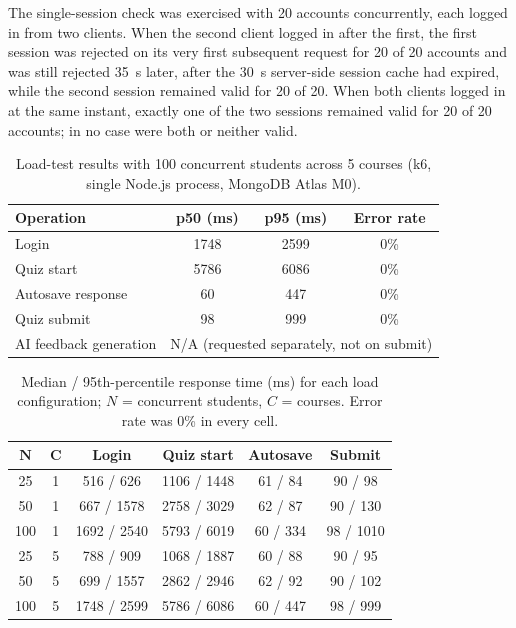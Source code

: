 \documentclass[conference]{IEEEtran}
\begin{document}
The single-session check was exercised with 20 accounts concurrently, each logged in from two clients. When the second client logged in after the first, the first session was rejected on its very first subsequent request for 20 of 20 accounts and was still rejected 35~s later, after the 30~s server-side session cache had expired, while the second session remained valid for 20 of 20. When both clients logged in at the same instant, exactly one of the two sessions remained valid for 20 of 20 accounts; in no case were both or neither valid.

\begin{table}[!t]
\centering
\caption{Load-test results with 100 concurrent students across 5 courses (k6, single Node.js process, MongoDB Atlas M0).}
\label{tab:load}
\footnotesize
\begin{tabular}{|l|c|c|c|}
\hline
\textbf{Operation} & \textbf{p50 (ms)} & \textbf{p95 (ms)} & \textbf{Error rate} \\
\hline
Login & 1748 & 2599 & 0\% \\
\hline
Quiz start & 5786 & 6086 & 0\% \\
\hline
Autosave response & 60 & 447 & 0\% \\
\hline
Quiz submit & 98 & 999 & 0\% \\
\hline
AI feedback generation & \multicolumn{3}{c|}{N/A (requested separately, not on submit)} \\
\hline
\end{tabular}
\end{table}

\begin{table}[!t]
\centering
\caption{Median / 95th-percentile response time (ms) for each load configuration; $N$ = concurrent students, $C$ = courses. Error rate was 0\% in every cell.}
\label{tab:load-levels}
\scriptsize
\setlength{\tabcolsep}{4pt}
\begin{tabular}{|c|c|c|c|c|c|}
\hline
$\boldsymbol{N}$ & $\boldsymbol{C}$ & \textbf{Login} & \textbf{Quiz start} & \textbf{Autosave} & \textbf{Submit} \\
\hline
25  & 1 & 516 / 626   & 1106 / 1448 & 61 / 84  & 90 / 98 \\
50  & 1 & 667 / 1578  & 2758 / 3029 & 62 / 87  & 90 / 130 \\
100 & 1 & 1692 / 2540 & 5793 / 6019 & 60 / 334 & 98 / 1010 \\
\hline
25  & 5 & 788 / 909   & 1068 / 1887 & 60 / 88  & 90 / 95 \\
50  & 5 & 699 / 1557  & 2862 / 2946 & 62 / 92  & 90 / 102 \\
100 & 5 & 1748 / 2599 & 5786 / 6086 & 60 / 447 & 98 / 999 \\
\hline
\end{tabular}
\end{table}
\end{document}

